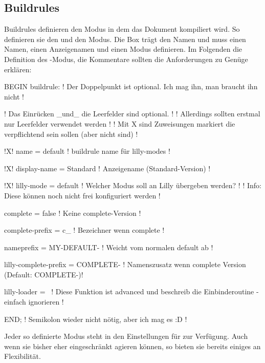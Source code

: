 \subsection{Buildrules}
Buildrules definieren den Modus in dem das Dokument kompiliert wird. So definieren sie den  und den  Modus. Die Box trägt den Namen  und muss einen Namen, einen Anzeigenamen und einen Modus definieren. Im Folgenden die Definition des -Modus, die Kommentare sollten die Anforderungen zu Genüge erklären:
{%
\begin{plaingepard}
BEGIN buildrule: ! Der Doppelpunkt ist optional. Ich mag ihn, man braucht ihn nicht !

    ! Das Einrücken _und_ die Leerfelder sind optional. !
    ! Allerdings sollten erstmal nur Leerfelder verwendet werden !
    ! Mit X sind Zuweisungen markiert die verpflichtend sein sollen (aber nicht sind) !

!X!  name                   = default     ! buildrule name für lilly-modes !

!X!  display-name           = Standard    ! Anzeigename (Standard-Version) !

!X!  lilly-mode             = default     ! Welcher Modus soll an Lilly übergeben werden? !
                                          ! Info: Diese können noch nicht frei konfiguriert werden !

     complete               = false       ! Keine complete-Version !

     complete-prefix        = c_          ! Bezeichner wenn complete !

     nameprefix             = MY-DEFAULT- ! Weicht vom normalen default ab !

     lilly-complete-prefix  = COMPLETE-   ! Namenszusatz wenn complete Version (Default: COMPLETE-)!

     lilly-loader           = \
                    ! Diese Funktion ist advanced und beschreib die Einbinderoutine - einfach
                      ignorieren !

END; ! Semikolon wieder nicht nötig, aber ich mag es :D !
\end{plaingepard}
}
Jeder so definierte Modus steht in den Einstellungen für  zur Verfügung. Auch wenn sie bisher eher eingeschränkt agieren können, so bieten sie bereits einiges an Flexibilität.

